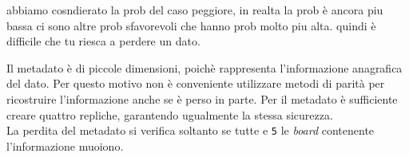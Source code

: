 abbiamo cosndierato la prob del caso peggiore, in realta la prob è ancora piu bassa ci sono altre prob sfavorevoli che hanno prob molto piu alta. quindi è difficile che tu riesca a perdere un dato.


Il metadato \`{e} di piccole dimensioni, poich\`{e} rappresenta l'informazione anagrafica del dato. 
Per questo motivo non \`{e} conveniente utilizzare metodi di parit\`{a} per ricostruire l'informazione anche se \`{e} perso in parte.
Per il metadato \`{e} sufficiente creare quattro repliche, garantendo ugualmente la stessa sicurezza. \\
La perdita del metadato si verifica soltanto se tutte e \verb"5" le \textit{board} contenente l'informazione muoiono.